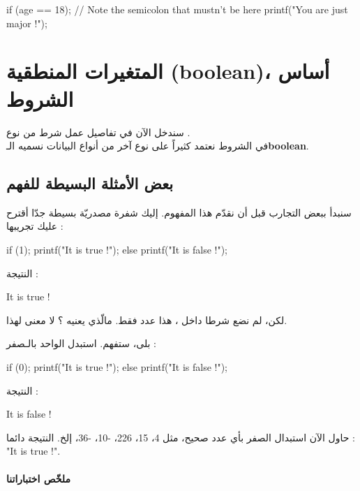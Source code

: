 \begin{Csource}
if (age == 18); // Note the semicolon that mustn't be here
{
	printf("You are just major !");
}
\end{Csource}

\section{المتغيرات المنطقية (\textenglish{boolean})، أساس الشروط}
سندخل الآن في تفاصيل عمل شرط من نوع
.\\
في الشروط نعتمد كثيراً على نوع آخر من أنواع البيانات نسميه الـ\textbf{\textenglish{boolean}}.

\subsection{بعض الأمثلة البسيطة للفهم}

سنبدأ ببعض التجارب قبل أن نقدّم هذا المفهوم. إليك شفرة مصدريّة بسيطة جدّا أقترح عليك تجريبها :

\begin{Csource}
if (1);
{
	printf("It is true !");
}
else
{
	printf("It is false !");
}
\end{Csource}

النتيجة : 

\begin{Console}
It is true !
\end{Console}

\begin{question}
لكن، لم نضع شرطا داخل
،
هذا عدد فقط. مالّذي يعنيه ؟ لا معنى لهذا.
\end{question}

بلى، ستفهم. استبدل الواحد بالـصفر :

\begin{Csource}
if (0);
{
	printf("It is true !");
}
else
{
	printf("It is false !");
}
\end{Csource}

النتيجة :
\begin{Console}
It is false !
\end{Console}

حاول الآن استبدال الصفر بأي عدد صحيح، مثل 4، 15، 226، -10، -36، إلخ. النتيجة دائما :
"\textenglish{It is true !}".

\paragraph{ملخّص اختباراتنا}


